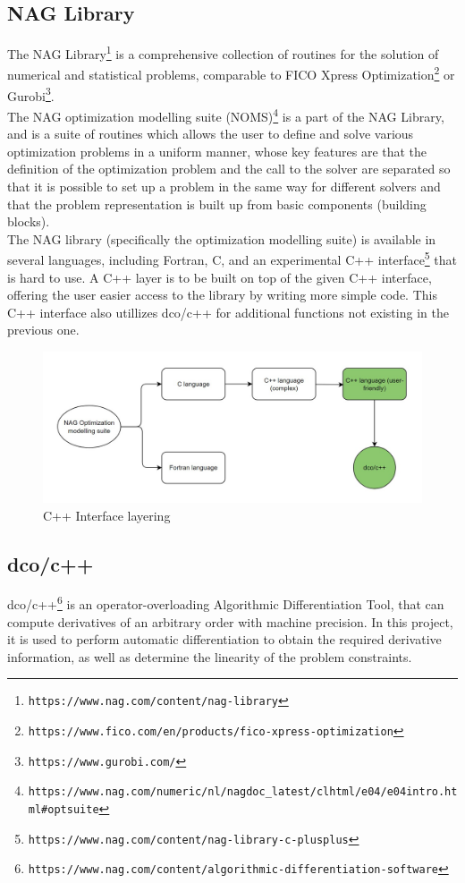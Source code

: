 \documentclass{book}
\begin{document}
\subsection{NAG Library}
The NAG Library\footnote{\tt https://www.nag.com/content/nag-library} is a comprehensive collection of routines for the solution of numerical and statistical problems, comparable to FICO Xpress Optimization\footnote{\tt https://www.fico.com/en/products/fico-xpress-optimization} or Gurobi\footnote{\tt https://www.gurobi.com/}.\\
\newline
The NAG optimization modelling suite (NOMS)\footnote{\tt https://www.nag.com/numeric/nl/nagdoc\_latest/clhtml/e04/e04intro.html\#optsuite} is a part of the NAG Library, and is a suite of routines which allows the user to define and solve various optimization problems in a uniform manner, whose key features are that the definition of the optimization problem and the call to the solver are separated so that it is possible to set up a problem in the same way for different solvers and that the problem representation is built up from basic components (building blocks).\\
\newline
The NAG library (specifically the optimization modelling suite) is available in several languages, including Fortran, C, and an experimental C++ interface\footnote{\tt https://www.nag.com/content/nag-library-c-plusplus} that is hard to use. A C++ layer is to be built on top of the given C++ interface, offering the user easier access to the library by writing more simple code. This C++ interface also utillizes dco/c++ for additional functions not existing in the previous one.
\begin{figure}[h]
\includegraphics[width=\textwidth]{layering.jpeg}
\caption{\small C++ Interface layering}
\end{figure}

\subsection{dco/c++}
dco/c++\footnote{\tt https://www.nag.com/content/algorithmic-differentiation-software} is an operator-overloading Algorithmic Differentiation Tool, that can compute derivatives of an arbitrary order with machine precision. In this project, it is used to perform automatic differentiation to obtain the required derivative information, as well as determine the linearity of the problem constraints.
\end{document}
